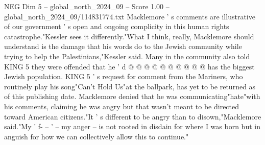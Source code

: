 \begin{textsample}{NEG Dim 5 – global\_north\_2024\_09 – Score 1.00 – global\_north\_2024\_09/114831774.txt}
Macklemore ' s comments are illustrative of our government ' s open and ongoing complicity in this human rights catastrophe."Kessler sees it differently."What I think, really, Macklemore should understand is the damage that his words do to the Jewish community while trying to help the Palestinians,"Kessler said.
Many in the community also told KING 5 they were offended that he ' d @ @ @ @ @ @ @ @ @ @ has the biggest Jewish population.
KING 5 ' s request for comment from the Mariners, who routinely play his song"Can't Hold Us"at the ballpark, has yet to be returned as of this publishing date.
Macklemore denied that he was communicating"hate"with his comments, claiming he was angry but that wasn't meant to be directed toward American citizens."It ' s different to be angry than to disown,"Macklemore said."My ' f- -- ' -- my anger -- is not rooted in disdain for where I was born but in anguish for how we can collectively allow this to continue."

\end{textsample}

